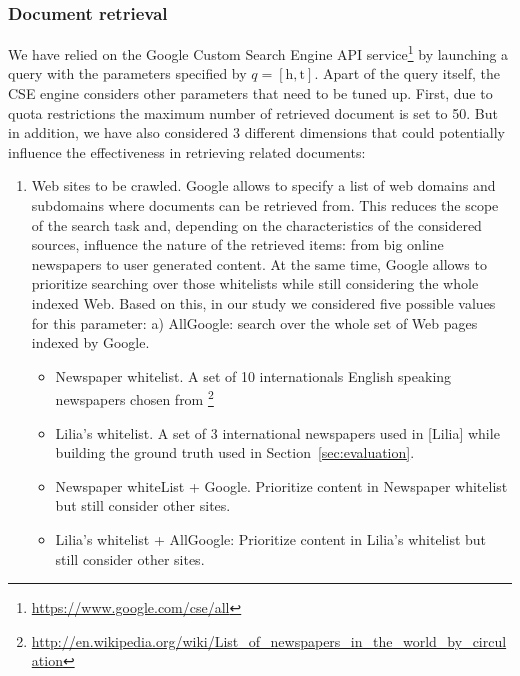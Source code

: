 \documentclass{llncs}
\begin{document}
\subsubsection{Document retrieval}
We have relied on the Google Custom Search Engine API service\footnote{\fontsize{8pt}{1em}\selectfont  \url{https://www.google.com/cse/all}} by launching a query with the parameters specified by $q= \left [ \text{h}, \text{t} \right ]$. Apart of the query itself, the CSE engine considers other parameters that need to be tuned up. First, due to quota restrictions the maximum number of retrieved document is set to 50. But in addition, we have also considered 3 different dimensions that could potentially influence the effectiveness in retrieving related documents:
\begin{enumerate}
 \item Web sites to be crawled. Google allows to specify a list of web domains and subdomains where documents can be retrieved from. This reduces the scope of the search task and, depending on the characteristics of the considered sources, influence the nature of the retrieved items: from big online newspapers to user generated content. At the same time, Google allows to prioritize searching over those whitelists while still considering the  whole indexed Web. Based on this, in our study we considered five possible values for this parameter:
a) AllGoogle: search over the whole set of Web pages indexed by Google.
 \begin{itemize}
  \item Newspaper whitelist. A set of 10 internationals English speaking newspapers chosen from \footnote{\fontsize{8pt}{1em}\selectfont  \url{http://en.wikipedia.org/wiki/List_of_newspapers_in_the_world_by_circulation}}
  \item Lilia's whitelist. A set of 3 international newspapers used in [Lilia] while building the ground truth used in Section~\ref{sec:evaluation}.
  \item Newspaper whiteList + Google. Prioritize content in Newspaper whitelist but still consider other sites.
  \item Lilia's whitelist + AllGoogle: Prioritize content in Lilia's whitelist but still consider other sites.
 \end{itemize}

\end{enumerate}
\end{document}
